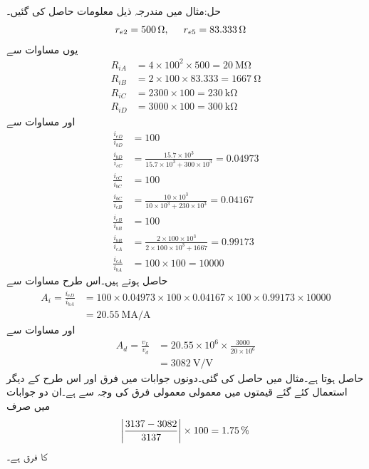 حل:مثال  میں مندرجہ ذیل معلومات حاصل کی گئیں۔
\begin{align*}
r_{e2}&=\SI{500}{\ohm}, \hspace{5mm} r_{e5}=\SI{83.333}{\ohm}
\end{align*}
یوں مساوات  سے
\begin{align*}
R_{iA}&=4 \times 100^2 \times 500=\SI{20}{\mega \ohm}\\
R_{iB}&=2 \times 100 \times 83.333=\SI{1667}{\ohm}\\
R_{iC}& =2300 \times 100=\SI{230}{\kilo \ohm}\\
R_{iD}& =3000 \times 100=\SI{300}{\kilo \ohm}
\end{align*}
اور مساوات  سے 
\begin{align*}
\frac{i_{eD}}{i_{bD}}&=100\\
\frac{i_{bD}}{i_{cC}}&=\frac{15.7 \times 10^3}{15.7 \times 10^3+300 \times 10^3}=0.04973\\
\frac{i_{cC}}{i_{bC}}&=100\\
\frac{i_{bC}}{i_{cB}}&=\frac{10 \times 10^3}{10 \times 10^3+230 \times 10^3}=0.04167\\
\frac{i_{cB}}{i_{bB}}&=100\\
\frac{i_{bB}}{i_{cA}}&=\frac{2 \times 100 \times 10^3}{2 \times 100 \times 10^3+1667}=0.99173\\
\frac{i_{cA}}{i_{bA}}&= 100 \times 100=10000
\end{align*}
حاصل ہوتے ہیں۔اس طرح مساوات  سے 
\begin{align*}
A_i=\frac{i_{eD}}{i_{bA}}&=100 \times 0.04973 \times 100 \times 0.04167 \times 100 \times 0.99173 \times 10000\\
&=\SI{20.55}{\mega \ampere \per \ampere}
\end{align*}
اور مساوات  سے 
\begin{align*}
A_d=\frac{v_L}{v_d} &=20.55 \times 10^6 \times \frac{3000}{20 \times 10^6}\\
&=\SI{3082}{\volt \per \volt}
\end{align*}
حاصل ہوتا ہے۔مثال  میں  حاصل کی گئی۔دونوں جوابات میں فرق  اور اس طرح کے دیگر استعمال کئے گئے قیمتوں میں معمولی معمولی فرق کی وجہ سے ہے۔ان دو جوابات میں صرف
\begin{align*}
\abs{\frac{3137-3082}{3137}} \times 100=\SI{1.75}{\percent}
\end{align*}
کا فرق ہے۔

